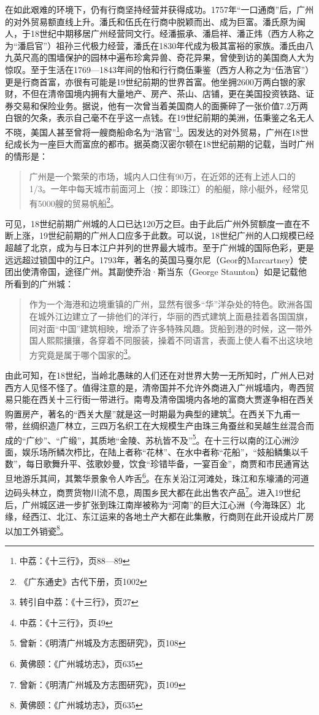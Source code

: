 在如此艰难的环境下，仍有行商坚持经营并获得成功。1757年“一口通商”后，广州的对外贸易额直线上升。潘氏和伍氏在行商中脱颖而出、成为巨富。潘氏原为闽人，于18世纪中期移居广州经营同文行。经潘振承、潘启祥、潘正炜（西方人称之为“潘启官”）祖孙三代极力经营，潘氏在1830年代成为极其富裕的家族。潘氏由八九英尺高的围墙保护的园林中遍布珍禽异兽、奇花异果，曾使到访的美国商人大为惊叹。至于生活在1769—1843年间的怡和行行商伍秉鉴（西方人称之为“伍浩官”）更是行商首富，亦很有可能是19世纪前期的世界首富。他坐拥2600万两白银的家财，不但在清帝国境内拥有大量地产、房产、茶山、店铺，更在美国投资铁路、证券交易和保险业务。据说，他有一次曾当着美国商人的面撕碎了一张价值7.2万两白银的欠条，表示自己毫不在乎这一点钱。在19世纪前期的美洲，伍秉鉴之名无人不晓，美国人甚至曾将一艘商船命名为“浩官”\footnote{中荔：《十三行》，页88—89}。因发达的对外贸易，广州在18世纪成长为一座巨大而富庶的都市。据英商汉密尔顿在18世纪前期的记载，当时广州的情形是：

\begin{quote}
	广州是一个繁荣的市场，城内人口住有90万，在近郊的还有上述人口的1/3。一年中每天城市前面河上（按：即珠江）的船艇，除小艇外，经常见有5000艘的贸易帆船\footnote{《广东通史》古代下册，页1002}。
	
\end{quote}

可见，18世纪前期广州城的人口已达120万之巨。由于此后广州外贸额度一直在不断上涨，19世纪前期的广州人口应多于此数。可以说，18世纪广州的人口规模已经超越了北京，成为与日本江户并列的世界最大城市。至于广州城的国际色彩，更是远远超过锁国中的江户。1793年，著名的英国马戛尔尼（Geor的Marcartney）使团出使清帝国，途径广州。其副使乔治·斯当东（George Staunton）如是记载他所看到的广州城：

\begin{quote}
作为一个海港和边境重镇的广州，显然有很多“华”洋杂处的特色。欧洲各国在城外江边建立了一排他们的洋行，华丽的西式建筑上面悬挂着各国国旗，同对面“中国”建筑相映，增添了许多特殊风趣。货船到港的时候，这一带外国人熙熙攘攘，各穿着不同服装，操着不同语言，表面上使人看不出这块地方究竟是属于哪个国家的\footnote{转引自中荔：《十三行》，页27}。

\end{quote}

由此可知，在18世纪，当岭北愚昧的人们还在对世界大势一无所知时，广州人已对西方人见怪不怪了。值得注意的是，清帝国并不允许外商进入广州城墙内，粤西贸易只能在西关十三行街一带进行。南粤及清帝国境内各地的富商大贾遂争相在西关购置房产，著名的“西关大屋”就是这一时期最为典型的建筑\footnote{中荔：《十三行》，页49}。在西关下九甫一带，丝绸织造厂林立，三四万名织工在大规模生产由珠三角蚕丝和吴越生丝混合而成的“广纱”、“广缎”，其质地“金陵、苏杭皆不及”\footnote{曾新：《明清广州城及方志图研究》，页108}。在十三行以南的江心洲沙面，娱乐场所鳞次栉比，在陆上者称“花林”、在水中者称“花船”，“妓船鳞集以千数”，每日歌舞升平、弦歌妙曼，饮食“珍错毕备，一宴百金”，商贾和市民通宵达旦地游乐其间，其繁华景象令人咋舌\footnote{黄佛颐：《广州城坊志》，页635}。在东关沿江河滩处，珠江和东壕涌的河道边码头林立，商贾货物川流不息，周围乡民大都在此出售农产品\footnote{曾新：《明清广州城及方志图研究》，页109}。进入19世纪后，广州城区进一步扩张到珠江南岸被称为“河南”的巨大江心洲（今海珠区）北缘，经西江、北江、东江运来的各地土产大都在此集散，行商则在此开设成片厂房以加工外销瓷\footnote{黄佛颐：《广州城坊志》，页635}。

